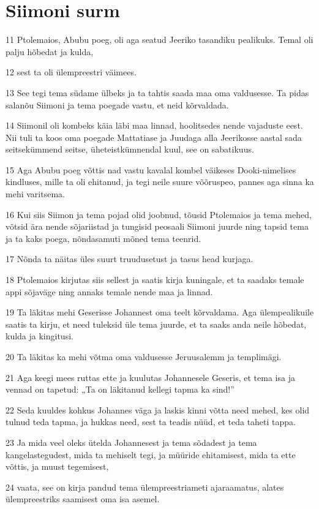 \section*{Siimoni surm}

\par 11 Ptolemaios, Abubu poeg, oli aga seatud Jeeriko tasandiku pealikuks. Temal oli palju hõbedat ja kulda,
\par 12 sest ta oli ülempreestri väimees.
\par 13 See tegi tema südame ülbeks ja ta tahtis saada maa oma valdusesse. Ta pidas salanõu Siimoni ja tema poegade vastu, et neid kõrvaldada.
\par 14 Siimonil oli kombeks käia läbi maa linnad, hoolitsedes nende vajaduste eest. Nii tuli ta koos oma poegade Mattatiase ja Juudaga alla Jeerikosse aastal sada seitsekümmend seitse, üheteistkümnendal kuul, see on sabatikuus.
\par 15 Aga Abubu poeg võttis nad vastu kavalal kombel väikeses Dooki-nimelises kindluses, mille ta oli ehitanud, ja tegi neile suure võõruspeo, pannes aga sinna ka mehi varitsema.
\par 16 Kui siis Siimon ja tema pojad olid joobnud, tõusid Ptolemaios ja tema mehed, võtsid ära nende sõjariistad ja tungisid peosaali Siimoni juurde ning tapsid tema ja ta kaks poega, nõndasamuti mõned tema teenrid.
\par 17 Nõnda ta näitas üles suurt truudusetust ja tasus head kurjaga.
\par 18 Ptolemaios kirjutas siis sellest ja saatis kirja kuningale, et ta saadaks temale appi sõjaväge ning annaks temale nende maa ja linnad.
\par 19 Ta läkitas mehi Geserisse Johannest oma teelt kõrvaldama. Aga ülempealikuile saatis ta kirju, et need tuleksid üle tema juurde, et ta saaks anda neile hõbedat, kulda ja kingitusi.
\par 20 Ta läkitas ka mehi võtma oma valdusesse Jeruusalemm ja templimägi.
\par 21 Aga keegi mees ruttas ette ja kuulutas Johannesele Geseris, et tema isa ja vennad on tapetud: „Ta on läkitanud kellegi tapma ka sind!”
\par 22 Seda kuuldes kohkus Johannes väga ja laskis kinni võtta need mehed, kes olid tulnud teda tapma, ja hukkas need, sest ta teadis nüüd, et teda taheti tappa.
\par 23 Ja mida veel oleks ütelda Johannesest ja tema sõdadest ja tema kangelastegudest, mida ta mehiselt tegi, ja müüride ehitamisest, mida ta ette võttis, ja muust tegemisest,
\par 24 vaata, see on kirja pandud tema ülempreestriameti ajaraamatus, alates ülempreestriks saamisest oma isa asemel.



